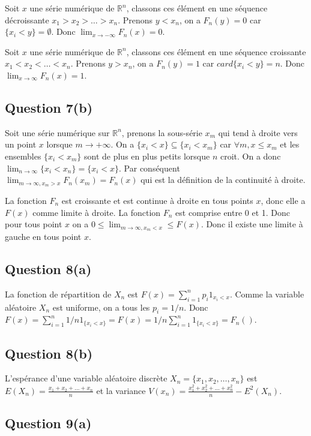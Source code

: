 \documentclass[]{book}
\theoremstyle{definition}
\newcommand{\bb}[1]{\mathbb{#1}}
\newcommand{\R}{\bb{R}}
\begin{document}
Soit $x$ une s\'erie num\'erique de $\R^n$, classons ces \'el\'ement en une s\'equence d\'ecroissante $x_1 > x_2 > \ldots > x_n$. Prenons $y < x_n$, on a $F_n(y) = 0$ car $\{ x_i < y \} = \emptyset$. Donc $\lim_{x \to -\infty}F_n(x) = 0$.

Soit $x$ une s\'erie num\'erique de $\R^n$, classons ces \'el\'ement en une s\'equence croissante $x_1 < x_2 < \ldots < x_n$. Prenons $y > x_n$, on a $F_n(y) = 1$ car $card \{ x_i < y \} = n$. Donc $\lim_{x \to \infty}F_n(x) = 1$.

\subsection*{Question 7(b)}
Soit une s\'erie num\'erique sur $\R^n$, prenons la sous-s\'erie $x_m$ qui tend \`a droite vers un point $x$ lorsque $m \to +\infty$. On a $\{ x_i < x\} \subseteq \{x_i < x_m\}$ car $\forall m, x \leq x_m$ et les ensembles $\{x_i < x_m\}$ sont de plus en plus petits lorsque $n$ croit. On a donc $\lim_{n \to \infty} \{ x_i < x_n\} = \{x_i < x\}$. Par cons\'equent $\lim_{m \to \infty, x_m > x} F_n(x_m) = F_n(x)$ qui est la d\'efinition de la continuit\'e \`a droite.

La fonction $F_n$ est croissante et est continue \`a droite en tous points $x$, donc elle a $F(x)$ comme limite \`a droite. La fonction $F_n$ est comprise entre 0 et 1. Donc pour tous point $x$ on a $0 \leq \lim_{m \to \infty, x_m < x} \leq F(x)$.  Donc il existe une limite \`a gauche en tous point $x$.

\subsection*{Question 8(a)}
La fonction de r\'epartition de $X_n$ est $F(x) = \sum_{i=1}^{n} p_i 1_{x_i < x}$. Comme la variable al\'eatoire $X_n$ est uniforme, on a tous les $p_i = 1/n$. Donc $F(x) = \sum_{i=1}^{n} 1/n 1_{\{x_i < x\}} = F(x) = 1/n \sum_{i=1}^{n} 1_{\{x_i < x\}} = F_n()$.

\subsection*{Question 8(b)}
L'esp\'erance d'une variable al\'eatoire discr\`ete $X_n = \{x_1, x_2, \ldots, x_n\}$ est $E(X_n) = \frac{x_1+x_2+\ldots + x_n}{n}$ et la variance $V(x_n) = \frac{x_1^2+x_2^2+\ldots + x_n^2}{n} - E^2(X_n)$.

\subsection*{Question 9(a)}
\end{document}
